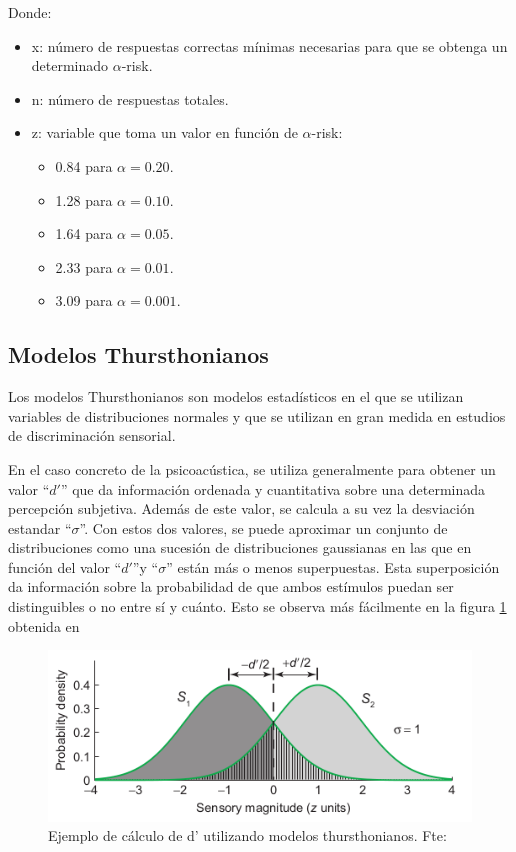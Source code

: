 \documentclass[11pt,a4paper]{book}
\begin{document}
            Donde:
            \begin{itemize}
                \item x: número de respuestas correctas mínimas necesarias para que se obtenga un determinado $\alpha$-risk.
                \item n: número de respuestas totales.
                \item z: variable que toma un valor en función de $\alpha$-risk:
                \begin{itemize}
                    \item 0.84 para $\alpha=0.20$.
                    \item 1.28 para $\alpha=0.10$.
                    \item 1.64 para $\alpha=0.05$.
                    \item 2.33 para $\alpha=0.01$.
                    \item 3.09 para $\alpha=0.001$.
                    
                \end{itemize}
            \end{itemize}
        \subsection*{Modelos Thursthonianos}
            Los modelos Thursthonianos son modelos estadísticos en el que se utilizan variables de distribuciones normales y que se utilizan en gran medida en estudios de discriminación sensorial. 
            
            En el caso concreto de la psicoacústica, se utiliza generalmente para obtener un valor ``$d'$'' que da información ordenada y cuantitativa sobre una determinada percepción subjetiva. Además de este valor, se calcula a su vez la desviación estandar ``$\sigma$''. Con estos dos valores, se puede aproximar un conjunto de distribuciones como una sucesión de distribuciones gaussianas en las que en función del valor ``$d'$''y ``$\sigma$'' están más o menos superpuestas. Esta superposición da información sobre la probabilidad de que ambos estímulos puedan ser distinguibles o no entre sí y cuánto. Esto se observa más fácilmente en la figura \ref{fig:modelost} obtenida en \cite{PsychophysicsB} 
            
            \begin{figure}
                \includegraphics[scale=0.7]{../imagenes/modelosthurst.png}
			    \centering
			    \caption{Ejemplo de cálculo de d' utilizando modelos thursthonianos. Fte: \cite{PsychophysicsB} }
			    \label{fig:modelost}
            \end{figure}
            
\end{document}
